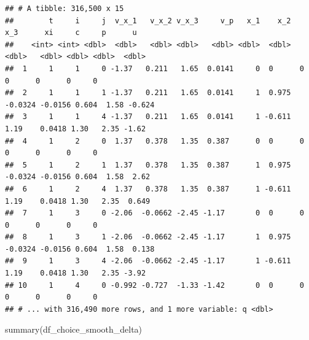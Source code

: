 \documentclass[
]{book}
\newenvironment{Shaded}{\begin{snugshade}}{\end{snugshade}}
\newcommand{\FunctionTok}[1]{\textcolor[rgb]{0.00,0.00,0.00}{#1}}
\newcommand{\NormalTok}[1]{#1}
\begin{document}
\begin{verbatim}
## # A tibble: 316,500 x 15
##        t     i     j  v_x_1   v_x_2 v_x_3     v_p   x_1    x_2     x_3      xi     c     p      u
##    <int> <int> <dbl>  <dbl>   <dbl> <dbl>   <dbl> <dbl>  <dbl>   <dbl>   <dbl> <dbl> <dbl>  <dbl>
##  1     1     1     0 -1.37   0.211   1.65  0.0141     0  0      0       0      0      0     0    
##  2     1     1     1 -1.37   0.211   1.65  0.0141     1  0.975 -0.0324 -0.0156 0.604  1.58 -0.624
##  3     1     1     4 -1.37   0.211   1.65  0.0141     1 -0.611  1.19    0.0418 1.30   2.35 -1.62 
##  4     1     2     0  1.37   0.378   1.35  0.387      0  0      0       0      0      0     0    
##  5     1     2     1  1.37   0.378   1.35  0.387      1  0.975 -0.0324 -0.0156 0.604  1.58  2.62 
##  6     1     2     4  1.37   0.378   1.35  0.387      1 -0.611  1.19    0.0418 1.30   2.35  0.649
##  7     1     3     0 -2.06  -0.0662 -2.45 -1.17       0  0      0       0      0      0     0    
##  8     1     3     1 -2.06  -0.0662 -2.45 -1.17       1  0.975 -0.0324 -0.0156 0.604  1.58  0.138
##  9     1     3     4 -2.06  -0.0662 -2.45 -1.17       1 -0.611  1.19    0.0418 1.30   2.35 -3.92 
## 10     1     4     0 -0.992 -0.727  -1.33 -1.42       0  0      0       0      0      0     0    
## # ... with 316,490 more rows, and 1 more variable: q <dbl>
\end{verbatim}

\begin{Shaded}
\begin{Highlighting}[]
\FunctionTok{summary}\NormalTok{(df\_choice\_smooth\_delta)}
\end{Highlighting}
\end{Shaded}
\end{document}
